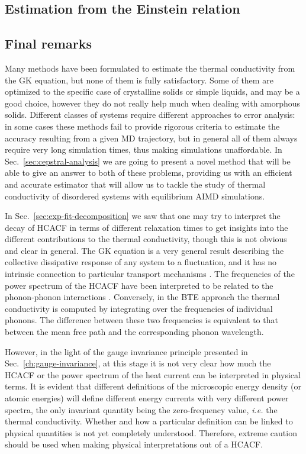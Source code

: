 \begin{LEtext}
\subsection{Estimation from the Einstein relation}
\LEnote{***************}


\subsection{Final remarks}  \label{sec:data-analysis-remarks}

Many methods have been formulated to estimate the thermal conductivity from the GK equation, but none of them is fully satisfactory. Some of them are optimized to the specific case of crystalline solids or simple liquids, and may be a good choice, however they do not really help much when dealing with amorphous solids. 
Different classes of systems require different approaches to error analysis: in some cases these methods fail to provide rigorous criteria to estimate the accuracy resulting from a given MD trajectory, but in general all of them always require very long simulation times, thus making \abinitio simulations unaffordable. 
In Sec.~\ref{sec:cepstral-analysis} we are going to present a novel method that will be able to give an answer to both of these problems, providing us with an efficient and accurate estimator that will allow us to tackle the study of thermal conductivity of disordered systems with equilibrium AIMD simulations. 

In Sec.~\ref{sec:exp-fit-decomposition} we saw that one may try to interpret the decay of HCACF in terms of different relaxation times to get insights into the different contributions to the thermal conductivity, though this is not obvious and clear in general. 
The GK equation is a very general result describing the collective dissipative response of any system to a fluctuation, and it has no intrinsic connection to particular transport mechanisms \cite{Howell2012}. 
The frequencies of the power spectrum of the HCACF have been interpreted to be related to the phonon-phonon interactions \cite{McGaughey2004a}. Conversely, in the BTE approach the thermal conductivity is computed by integrating over the frequencies of individual phonons. The difference between these two frequencies is equivalent to that between the mean free path and the corresponding phonon wavelength. 

However, in the light of the gauge invariance principle presented in Sec.~\ref{ch:gauge-invariance}, at this stage it is not very clear how much the HCACF or the power spectrum of the heat current can be interpreted in physical terms. It is evident that different definitions of the microscopic energy density (or atomic energies) will define different energy currents with very different power spectra, the only invariant quantity being the zero-frequency value, \emph{i.e.} the thermal conductivity. 
Whether and how a particular definition can be linked to physical quantities is not yet completely understood. Therefore, extreme caution should be used when making physical interpretations out of a HCACF. 


\end{LEtext}
